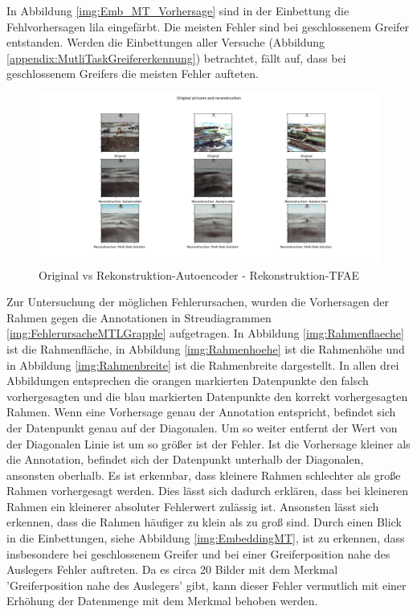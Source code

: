 	In Abbildung \ref{img:Emb_MT_Vorhersage} sind in der Einbettung die Fehlvorhersagen lila eingefärbt. Die meisten Fehler sind bei geschlossenem Greifer entstanden. Werden die Einbettungen aller Versuche (Abbildung \ref{appendix:MutliTaskGreifererkennung}) betrachtet, fällt auf, dass bei geschlossenem Greifers die meisten Fehler aufteten.
	\begin{figure}[h]
		\centering
		\includegraphics[width=1\textwidth, center]{bilder/Hauptteil/MT_Grapple/OriginalPicturesandReconstruction.png}
		\caption{Original vs Rekonstruktion-Autoencoder - Rekonstruktion-TFAE}
		\label{img:RekonstruktionMTAE}
	\end{figure}  	
	Zur Untersuchung der möglichen Fehlerursachen, wurden die Vorhersagen der Rahmen gegen die Annotationen in Streudiagrammen \ref{img:FehlerursacheMTLGrapple} aufgetragen. In Abbildung \ref{img:Rahmenflaeche} ist die Rahmenfläche, in Abbildung \ref{img:Rahmenhoehe} ist die Rahmenhöhe und in Abbildung \ref{img:Rahmenbreite} ist die Rahmenbreite dargestellt. In allen drei Abbildungen entsprechen die orangen markierten Datenpunkte den falsch vorhergesagten und die blau markierten Datenpunkte den korrekt vorhergesagten Rahmen. Wenn eine Vorhersage genau der Annotation entspricht, befindet sich der Datenpunkt genau auf der Diagonalen. Um so weiter entfernt der Wert von der Diagonalen Linie ist um so größer ist der Fehler. Ist die Vorhersage kleiner als die Annotation, befindet sich der Datenpunkt unterhalb der Diagonalen, ansonsten oberhalb. Es ist erkennbar, dass kleinere Rahmen schlechter als große Rahmen vorhergesagt werden. Dies lässt sich dadurch erklären, dass bei kleineren Rahmen ein kleinerer absoluter Fehlerwert zulässig ist. Ansonsten lässt sich erkennen, dass die Rahmen häufiger zu klein als zu groß sind. Durch einen Blick in die Einbettungen, siehe Abbildung \ref{img:EmbeddingMT}, ist zu erkennen, dass insbesondere bei geschlossenem Greifer und bei einer Greiferposition nahe des Auslegers Fehler auftreten. Da es circa 20 Bilder mit dem Merkmal 'Greiferposition nahe des Auslegers' gibt, kann dieser Fehler vermutlich mit einer Erhöhung der Datenmenge mit dem Merkmal behoben werden. 
